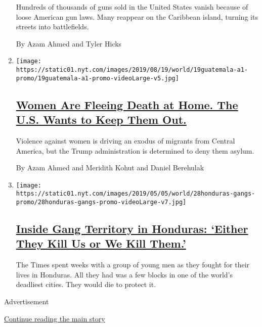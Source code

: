 \begin{enumerate}
  Hundreds of thousands of guns sold in the United States vanish because
  of loose American gun laws. Many reappear on the Caribbean island,
  turning its streets into battlefields.

  By Azam Ahmed and Tyler Hicks
\item
  \texttt{[image: https://static01.nyt.com/images/2019/08/19/world/19guatemala-a1-promo/19guatemala-a1-promo-videoLarge-v5.jpg]}

  \hypertarget{women-are-fleeing-death-at-home-the-us-wants-to-keep-them-out}{%
  \subsection{\texorpdfstring{\href{/2019/08/18/world/americas/guatemala-violence-women-asylum.html}{Women
  Are Fleeing Death at Home. The U.S. Wants to Keep Them
  Out.}}{Women Are Fleeing Death at Home. The U.S. Wants to Keep Them Out.}}\label{women-are-fleeing-death-at-home-the-us-wants-to-keep-them-out}}

  Violence against women is driving an exodus of migrants from Central
  America, but the Trump administration is determined to deny them
  asylum.

  By Azam Ahmed and Meridith Kohut and Daniel Berehulak
\item
  \texttt{[image: https://static01.nyt.com/images/2019/05/05/world/28honduras-gangs-promo/28honduras-gangs-promo-videoLarge-v7.jpg]}

  \hypertarget{inside-gang-territory-in-honduras-either-they-kill-us-or-we-kill-them}{%
  \subsection{\texorpdfstring{\href{/interactive/2019/05/04/world/americas/honduras-gang-violence.html}{Inside
  Gang Territory in Honduras: `Either They Kill Us or We Kill
  Them.'}}{Inside Gang Territory in Honduras: `Either They Kill Us or We Kill Them.'}}\label{inside-gang-territory-in-honduras-either-they-kill-us-or-we-kill-them}}

  The Times spent weeks with a group of young men as they fought for
  their lives in Honduras. All they had was a few blocks in one of the
  world's deadliest cities. They would die to protect it.
\end{enumerate}

Advertisement

\protect\hyperlink{after-mid3}{Continue reading the main story}

